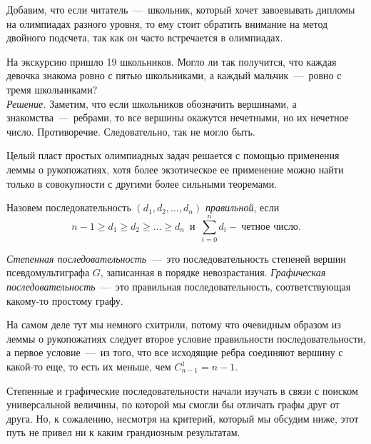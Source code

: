 	Добавим, что если читатель~---~школьник, который хочет завоевывать дипломы на олимпиадах разного уровня, то ему стоит обратить внимание на метод двойного подсчета, так как он часто встречается в олимпиадах.
	
\begin{example}
	На экскурсию пришло 19 школьников. Могло ли так получится, что каждая девочка знакома ровно с пятью школьниками, а каждый мальчик~---~ровно с тремя школьниками?\\
	
	\emph{Решение.} Заметим, что если школьников обозначить вершинами, а знакомства~---~ребрами, то все вершины окажутся нечетными, но их нечетное число. Противоречие. Следовательно, так не могло быть.
\end{example}

	Целый пласт простых олимпиадных задач решается с помощью применения леммы о рукопожатиях, хотя более экзотическое ее применение можно найти только в совокупности с другими более сильными теоремами. 


\begin{definition}
	Назовем последовательность $(d_1, d_2, \dots, d_n)$ \emph{правильной}, если $$n-1 \geqslant d_1 \geqslant d_2 \geqslant \dots \geqslant d_n \;\ \text{и} \;\ \sum_{i=0}^n d_i - \!\ \text{четное число}.$$  
\end{definition}

\begin{definition}
	\emph{Степенная последовательность}~---~это последовательность степеней вершин псевдомультиграфа $G$, записанная в порядке невозрастания. \emph{Графическая последовательность}~---~это правильная последовательность, соответствующая какому-то простому графу.
\end{definition}

	На самом деле тут мы немного схитрили, потому что очевидным образом из леммы о рукопожатиях следует второе условие правильности последовательности, а первое условие~---~из того, что все исходящие ребра соединяют вершину с какой-то еще, то есть их меньше, чем $C_{n-1}^1 = n-1$. 
	
	Степенные и графические последовательности начали изучать в связи с поиском универсальной величины, по которой мы смогли бы отличать графы друг от друга. Но, к сожалению, несмотря на критерий, который мы обсудим ниже, этот путь не привел ни к каким грандиозным результатам.	
	

